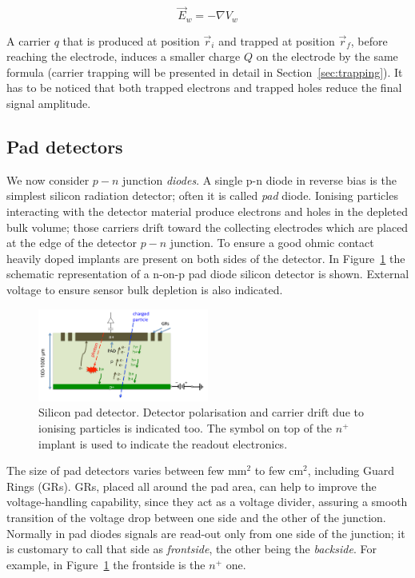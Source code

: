 \begin{equation}
\vec{E}_w = - \nabla V_w
\label{eq:weightrel}
\end{equation}

A carrier $q$ that is produced at position $\vec{r}_i$ and trapped at position $\vec{r}_f$, before 
reaching the electrode, induces a smaller charge $Q$ on the electrode by the same formula 
(carrier trapping will be presented in detail in Section~\ref{sec:trapping}). It has to be noticed that both 
trapped electrons and trapped holes reduce the final signal amplitude.

\subsection{Pad detectors}
\label{sec:pads}

We now consider $p-n$ junction {\it diodes}.
A single p-n diode in reverse bias is the simplest silicon radiation detector; 
often it is called {\it pad} diode. Ionising  particles interacting with  the detector material 
produce electrons and holes in the depleted bulk volume; those carriers drift toward 
the collecting electrodes which are placed at the edge of the detector $p-n$ junction. 
To ensure 
a good ohmic contact heavily doped implants are present on both sides of the detector. 
In Figure~\ref{fig:pad} the schematic representation  of a n-on-p pad diode silicon detector is 
shown. External voltage to ensure sensor bulk depletion is also indicated.  


\begin{figure}[!htbp]
   \centering
   \includegraphics[width=0.5\textwidth]{pad.pdf} 
      \caption{\label{fig:pad} Silicon pad detector. Detector polarisation and carrier drift due to 
      ionising particles is indicated too. The symbol on top of the $n^+$ implant is used to indicate the 
      readout electronics.}
\end{figure}
The size of pad detectors varies between few mm$^2$ to few cm$^2$,
including Guard Rings (GRs).  GRs, placed all
around the pad area, can help to improve the voltage-handling capability, since they act as a 
voltage divider, assuring a smooth transition of the voltage drop between one side 
and the other of the junction. 
Normally in pad diodes signals are read-out only from one side of the junction; it is customary 
to call that side as {\it frontside}, the other being the {\it backside}. 
For example, in Figure~\ref{fig:pad} the 
frontside is the $n^+$ one.


